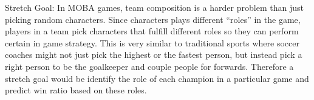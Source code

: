 \documentclass[conference]{IEEEtran}
\begin{document}
Stretch Goal:
In MOBA games, team composition is a harder problem than just picking random characters. Since characters plays different ``roles'' in the game, players in a team pick characters that fulfill different roles so they can perform certain in game strategy. This is very similar to traditional sports where soccer coaches might not just pick the highest or the fastest person, but instead pick a right person to be the goalkeeper and couple people for forwards. Therefore a stretch goal would be identify the role of each champion in a particular game and predict win ratio based on these roles.



%
%



%
%
\end{document}
